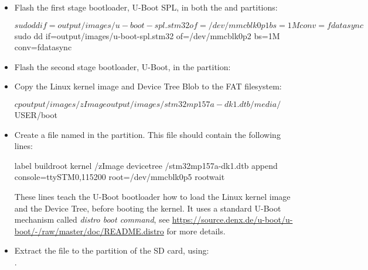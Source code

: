 \begin{itemize}

\item Flash the first stage bootloader, U-Boot SPL, in both the
   and  partitions:

\begin{bashinput}
$ sudo dd if=output/images/u-boot-spl.stm32 of=/dev/mmcblk0p1 bs=1M conv=fdatasync
$ sudo dd if=output/images/u-boot-spl.stm32 of=/dev/mmcblk0p2 bs=1M conv=fdatasync
\end{bashinput}

\item Flash the second stage bootloader, U-Boot, in the 
  partition:


\item Copy the Linux kernel image and Device Tree Blob to the FAT filesystem:

\begin{bashinput}
$ cp output/images/zImage output/images/stm32mp157a-dk1.dtb /media/$USER/boot
\end{bashinput}

\item Create a file named  in the
   partition. This file should contain the following lines:

{\small
\begin{fileinput}
label buildroot
  kernel /zImage
  devicetree /stm32mp157a-dk1.dtb
  append console=ttySTM0,115200 root=/dev/mmcblk0p5 rootwait
\end{fileinput}
}

These lines teach the U-Boot bootloader how to load the Linux kernel
image and the Device Tree, before booting the kernel. It uses a
standard U-Boot mechanism called {\em distro boot command}, see
\url{https://source.denx.de/u-boot/u-boot/-/raw/master/doc/README.distro}
for more details.

\item Extract the  file to the 
  partition of the SD card, using:\\
  .

\end{itemize}

